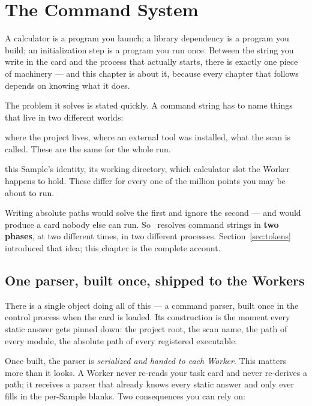 \chapter{The Command System}
\label{ch:command-system}

 A
calculator is a program you launch; a library dependency is a program you build; an
initialization step is a program you run once. Between the string you write in the card
and the process that actually starts, there is exactly one piece of machinery --- and
this chapter is about it, because every chapter that follows depends on knowing what it
does.

The problem it solves is stated quickly. A command string has to name things that live
in two different worlds:

\begin{description}[leftmargin=1.6em]
  \item[Things known when the card is read] where the project lives, where an external
        tool was installed, what the scan is called. These are the same for the whole
        run.
  \item[Things not known until a point exists] this Sample's identity, its working
        directory, which calculator slot the Worker happens to hold. These differ for
        every one of the million points you may be about to run.
\end{description}

Writing absolute paths would solve the first and ignore the second --- and would produce
a card nobody else can run. So \Jtwo\ resolves command strings in \textbf{two phases}, at
two different times, in two different processes. Section~\ref{sec:tokens} introduced that
idea; this chapter is the complete account.

\section{One parser, built once, shipped to the Workers}
\label{sec:parser-lifecycle}

There is a single object doing all of this --- a command parser, built once in the
control process when the card is loaded. Its construction is the moment every static
answer gets pinned down: the project root, the scan name, the path of every
 module, the absolute path of every registered executable.

Once built, the parser is \emph{serialized and handed to each Worker}. This matters more
than it looks. A Worker never re-reads your task card and never re-derives a path; it
receives a parser that already knows every static answer and only ever fills in the
per-Sample blanks. Two consequences you can rely on:

